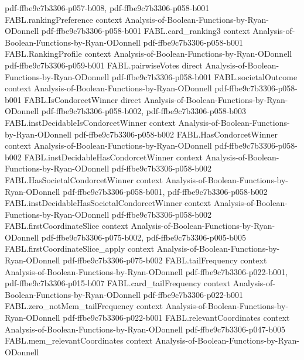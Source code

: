 \begin{theorem}
  {pdf-ffbe9c7b3306-p057-b008,
    pdf-ffbe9c7b3306-p058-b001}
\proofstep
  {FABL.rankingPreference}
  {context}
  {Analysis-of-Boolean-Functions-by-Ryan-ODonnell}
  {pdf-ffbe9c7b3306-p058-b001}
\proofstep
  {FABL.card_ranking3}
  {context}
  {Analysis-of-Boolean-Functions-by-Ryan-ODonnell}
  {pdf-ffbe9c7b3306-p058-b001}
\proofstep
  {FABL.RankingProfile}
  {context}
  {Analysis-of-Boolean-Functions-by-Ryan-ODonnell}
  {pdf-ffbe9c7b3306-p059-b001}
\proofstep
  {FABL.pairwiseVotes}
  {direct}
  {Analysis-of-Boolean-Functions-by-Ryan-ODonnell}
  {pdf-ffbe9c7b3306-p058-b001}
\proofstep
  {FABL.societalOutcome}
  {context}
  {Analysis-of-Boolean-Functions-by-Ryan-ODonnell}
  {pdf-ffbe9c7b3306-p058-b001}
\proofstep
  {FABL.IsCondorcetWinner}
  {direct}
  {Analysis-of-Boolean-Functions-by-Ryan-ODonnell}
  {pdf-ffbe9c7b3306-p058-b002,
    pdf-ffbe9c7b3306-p058-b003}
\proofstep
  {FABL.instDecidableIsCondorcetWinner}
  {context}
  {Analysis-of-Boolean-Functions-by-Ryan-ODonnell}
  {pdf-ffbe9c7b3306-p058-b002}
\proofstep
  {FABL.HasCondorcetWinner}
  {context}
  {Analysis-of-Boolean-Functions-by-Ryan-ODonnell}
  {pdf-ffbe9c7b3306-p058-b002}
\proofstep
  {FABL.instDecidableHasCondorcetWinner}
  {context}
  {Analysis-of-Boolean-Functions-by-Ryan-ODonnell}
  {pdf-ffbe9c7b3306-p058-b002}
\proofstep
  {FABL.HasSocietalCondorcetWinner}
  {context}
  {Analysis-of-Boolean-Functions-by-Ryan-ODonnell}
  {pdf-ffbe9c7b3306-p058-b001,
    pdf-ffbe9c7b3306-p058-b002}
\proofstep
  {FABL.instDecidableHasSocietalCondorcetWinner}
  {context}
  {Analysis-of-Boolean-Functions-by-Ryan-ODonnell}
  {pdf-ffbe9c7b3306-p058-b002}
\proofstep
  {FABL.firstCoordinateSlice}
  {context}
  {Analysis-of-Boolean-Functions-by-Ryan-ODonnell}
  {pdf-ffbe9c7b3306-p075-b002,
    pdf-ffbe9c7b3306-p005-b005}
\proofstep
  {FABL.firstCoordinateSlice_apply}
  {context}
  {Analysis-of-Boolean-Functions-by-Ryan-ODonnell}
  {pdf-ffbe9c7b3306-p075-b002}
\proofstep
  {FABL.tailFrequency}
  {context}
  {Analysis-of-Boolean-Functions-by-Ryan-ODonnell}
  {pdf-ffbe9c7b3306-p022-b001,
    pdf-ffbe9c7b3306-p015-b007}
\proofstep
  {FABL.card_tailFrequency}
  {context}
  {Analysis-of-Boolean-Functions-by-Ryan-ODonnell}
  {pdf-ffbe9c7b3306-p022-b001}
\proofstep
  {FABL.zero_notMem_tailFrequency}
  {context}
  {Analysis-of-Boolean-Functions-by-Ryan-ODonnell}
  {pdf-ffbe9c7b3306-p022-b001}
\proofstep
  {FABL.relevantCoordinates}
  {context}
  {Analysis-of-Boolean-Functions-by-Ryan-ODonnell}
  {pdf-ffbe9c7b3306-p047-b005}
\proofstep
  {FABL.mem_relevantCoordinates}
  {context}
  {Analysis-of-Boolean-Functions-by-Ryan-ODonnell}

\end{theorem}
